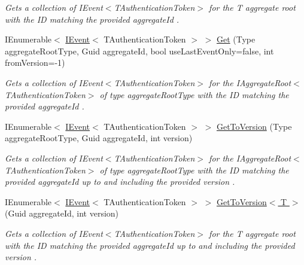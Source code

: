 \begin{DoxyCompactItemize}
\begin{DoxyCompactList}\small\item\em Gets a collection of I\+Event$<$\+T\+Authentication\+Token$>$ for the {\itshape T} aggregate root with the ID matching the provided {\itshape aggregate\+Id} . \end{DoxyCompactList}\item 
I\+Enumerable$<$ \hyperlink{interfaceCqrs_1_1Events_1_1IEvent}{I\+Event}$<$ T\+Authentication\+Token $>$ $>$ \hyperlink{classCqrs_1_1EventStore_1_1EventStore_a60e5974f82d907cad6e74ea29fb13e71_a60e5974f82d907cad6e74ea29fb13e71}{Get} (Type aggregate\+Root\+Type, Guid aggregate\+Id, bool use\+Last\+Event\+Only=false, int from\+Version=-\/1)
\begin{DoxyCompactList}\small\item\em Gets a collection of I\+Event$<$\+T\+Authentication\+Token$>$ for the I\+Aggregate\+Root$<$\+T\+Authentication\+Token$>$ of type {\itshape aggregate\+Root\+Type}  with the ID matching the provided {\itshape aggregate\+Id} . \end{DoxyCompactList}\item 
I\+Enumerable$<$ \hyperlink{interfaceCqrs_1_1Events_1_1IEvent}{I\+Event}$<$ T\+Authentication\+Token $>$ $>$ \hyperlink{classCqrs_1_1EventStore_1_1EventStore_aae9da24e2ad4bbe6629c9419c850e03b_aae9da24e2ad4bbe6629c9419c850e03b}{Get\+To\+Version} (Type aggregate\+Root\+Type, Guid aggregate\+Id, int version)
\begin{DoxyCompactList}\small\item\em Gets a collection of I\+Event$<$\+T\+Authentication\+Token$>$ for the I\+Aggregate\+Root$<$\+T\+Authentication\+Token$>$ of type {\itshape aggregate\+Root\+Type}  with the ID matching the provided {\itshape aggregate\+Id}  up to and including the provided {\itshape version} . \end{DoxyCompactList}\item 
I\+Enumerable$<$ \hyperlink{interfaceCqrs_1_1Events_1_1IEvent}{I\+Event}$<$ T\+Authentication\+Token $>$ $>$ \hyperlink{classCqrs_1_1EventStore_1_1EventStore_a43d9cb0a660b9d2dd10d90c41dbf528e_a43d9cb0a660b9d2dd10d90c41dbf528e}{Get\+To\+Version$<$ T $>$} (Guid aggregate\+Id, int version)
\begin{DoxyCompactList}\small\item\em Gets a collection of I\+Event$<$\+T\+Authentication\+Token$>$ for the {\itshape T} aggregate root with the ID matching the provided {\itshape aggregate\+Id}  up to and including the provided {\itshape version} . \end{DoxyCompactList}\item 

\end{DoxyCompactItemize}
